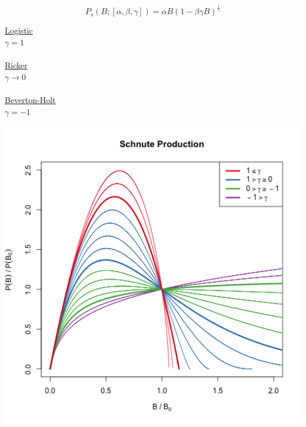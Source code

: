 \documentclass[ xcolor = pdftex, dvipsnames, table ]{beamer}
\begin{document}
%
\begin{frame}
\begin{equation*}
P_s(B;[\alpha, \beta, \gamma]) = \alpha B(1-\beta\gamma B)^{\frac{1}{\gamma}}
\end{equation*}
%
\begin{minipage}[h!]{0.46\textwidth}
        \vspace{-1cm}
        \begin{center}
        {\color{Red}\underline{Logistic}}\\
        $\gamma = 1$\\$~$\\
        {\color{RoyalBlue}\underline{Ricker}}\\
        $\gamma \rightarrow 0$\\$~$\\   %
        {\color{ForestGreen}\underline{Beverton-Holt}}\\
        $\gamma = -1$           %
        \end{center}
\end{minipage}
\begin{minipage}[h!]{0.52\textwidth}
        \includegraphics[width=1.1\textwidth]{../../gpBias/g3.png} %

\end{minipage}
\end{frame}
\end{document}

